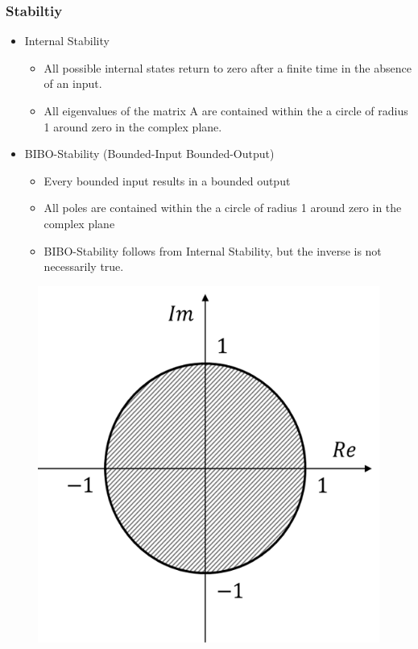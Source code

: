 \begin{frame}
	\frametitle{Stabiltiy}
	\begin{itemize}
		\item Internal Stability
		\begin{itemize}
			\item All possible internal states return to zero after a finite time in the absence of an input.
			\item 	All eigenvalues of the matrix A are contained within the a circle of radius 1 around zero in the complex plane.
		\end{itemize}
		\item BIBO-Stability (Bounded-Input Bounded-Output)
		\begin{itemize}
			\item Every bounded input results in a bounded output
			\item All poles are contained within the a circle of radius 1 around zero in the complex plane
			\item BIBO-Stability follows from Internal Stability, but the inverse is not necessarily true.
		\end{itemize}
	\end{itemize}
\end{frame}
\begin{frame}
\begin{figure}
\centering
\includegraphics[height=0.7\textheight]{Images/discrete_time_systems_27}
\label{fig:discrete_time_systems_27}
\end{figure}
\end{frame}
